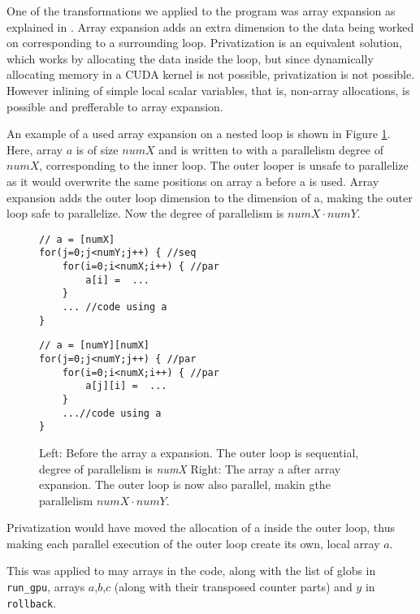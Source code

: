 One of the transformations we applied to the program was array expansion as
explained in \cite[Slide 11]{projectslide}. Array expansion adds an extra dimension to the data being worked on corresponding to a surrounding loop. Privatization is an equivalent solution, which works by allocating the data inside the loop, but since dynamically allocating memory in a CUDA kernel is not possible, privatization is not possible.
However inlining of simple local scalar variables, that is, non-array allocations, is possible and prefferable to array expansion.

An example of a used array expansion on a nested loop is shown in Figure \ref{code:arrayexpansion}. Here, array $a$ is of size $numX$ and is written to with a parallelism degree of $numX$, corresponding to the inner loop. The outer looper is unsafe to parallelize as it would overwrite the same positions on array a before a is used. Array expansion adds the outer loop dimension to the dimension of a, making the outer loop safe to parallelize. Now the degree of parallelism is $numX\cdot numY$.

\begin{figure}[H]
    \begin{minipage}{.45\textwidth}
        \begin{lstlisting}
// a = [numX]
for(j=0;j<numY;j++) { //seq
    for(i=0;i<numX;i++) { //par
        a[i] =  ...
    }
    ... //code using a
}
        \end{lstlisting}
    \end{minipage}\hfill
    \begin{minipage}{.45\textwidth}
        \begin{lstlisting}
// a = [numY][numX]
for(j=0;j<numY;j++) { //par
    for(i=0;i<numX;i++) { //par
        a[j][i] =  ...
    }
    ...//code using a
}
        \end{lstlisting}
    \end{minipage}
    \caption{Left: Before the array a expansion. The outer loop is sequential, degree of parallelism is \textit{numX} Right: The array a after array expansion. The outer loop is now also parallel, makin gthe parallelism $numX\cdot numY$.}
    \label{code:arrayexpansion}
\end{figure}

Privatization would have moved the allocation of a inside the outer loop, thus making each parallel execution of the outer loop create its own, local array $a$.

This was applied to may arrays in the code, along with the list of globs in \texttt{run\_gpu}, arrays $a$,$b$,$c$ (along with their transposed counter parts) and $y$ in \texttt{rollback}.


